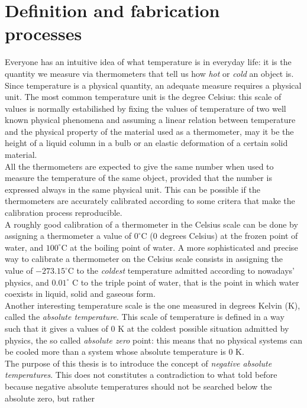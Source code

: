 \section{Definition and fabrication processes}
Everyone has an intuitive idea of what temperature is in everyday life: it is the quantity we measure via thermometers that tell us how \emph{hot} or \emph{cold} an object is. \\
Since temperature is a physical quantity, an adequate measure requires a physical unit. The most common temperature unit is the degree Celsius: this scale of values is normally estabilished by fixing the values of temperature of two well known
physical phenomena and assuming a linear relation between temperature and the physical property of the material used as a thermometer, may it be the height of a liquid column in a bulb or an elastic deformation of a certain solid material. \\
All the thermometers are expected to give the same number when used to measure the temperature of the same object, provided that 
the number is expressed always in the same physical unit. This can be possible if the thermometers are accurately calibrated according to some critera that make the calibration process reproducible. \\
A roughly good calibration of a thermometer in the Celsius scale can be done by assigning a thermometer a value of $0^\circ$C (0 degrees Celsius) at the frozen point of water, and $100^\circ$C at the boiling point of water. A more sophisticated and precise way to calibrate a thermometer 
on the Celsius scale consists in assigning the value of $-273.15^\circ$C to the \emph{coldest} temperature admitted according to nowadays' physics, and $0.01^\circ$ C to the triple point of water, that 
is the point in which water coexists in liquid, solid and gaseous form. \\
Another interesting temperature scale is the one measured in degrees Kelvin (K), called the \emph{absolute temperature}. This scale of temperature is 
defined in a way such that it gives a values of $0$ K at the coldest possible situation admitted by physics, the so called \emph{absolute zero} point: this means that no physical systems can be cooled more than a system 
whose absolute temperature is $0$ K. \\
The purpose of this thesis is to introduce the concept of \emph{negative absolute temperatures}. This does not constitutes a contradiction to what told before because negative absolute temperatures should not be searched below the absolute zero, but rather 
